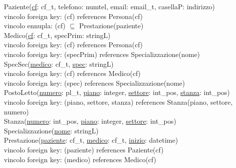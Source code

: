 \documentclass[a4paper,12pt]{report}
\begin{document}
      \hspace*{-0.75cm}
      Paziente(\underline{cf}: cf\_t, telefono: numtel, email: email\_t, casellaP: indirizzo) \\
      \hspace*{1cm}vincolo foreign key: (cf) references Persona(cf) \\
      \hspace*{1cm}vincolo ennupla: (cf) $\subseteq$ Prestazione(paziente) \\

      \hspace*{-0.75cm}
      Medico(\underline{cf}: cf\_t, specPrim: stringL) \\
      \hspace*{1cm}vincolo foreign key: (cf) references Persona(cf) \\
      \hspace*{1cm}vincolo foreign key: (specPrim) references Specializzazione(nome) \\

      \hspace*{-0.75cm}
      SpecSec(\underline{medico}: cf\_t, \underline{spec}: stringL) \\
      \hspace*{1cm}vincolo foreign key: (cf) references Medico(cf) \\
      \hspace*{1cm}vincolo foreign key: (spec) references Specializzazione(nome) \\

      \hspace*{-0.75cm}
      PostoLetto(\underline{numero}: pl\_t, \underline{piano}: integer, \underline{settore}: int\_pos, \underline{stanza}: int\_pos) \\
      \hspace*{1cm} vincolo foreign key: (piano, settore, stanza) references Stanza(piano, settore, numero) \\

      \hspace*{-0.75cm}
      Stanza(\underline{numero}: int\_pos, \underline{piano}: integer, \underline{settore}: int\_pos) \\

      \hspace*{-0.75cm}
      Specializzazione(\underline{nome}: stringL) \\

      \hspace*{-0.75cm}
      Prestazione(\underline{paziente}: cf\_t, \underline{medico}: cf\_t, \underline{inizio}: datetime) \\
      \hspace*{1cm}vincolo foreign key: (paziente) references Paziente(cf) \\
      \hspace*{1cm}vincolo foreign key: (medico) references Medico(cf) \\
\end{document}

